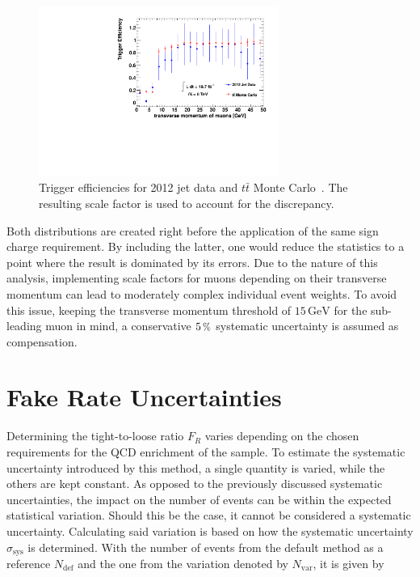 \begin{figure}[!htb]
  \centering
  \includegraphics[width=0.7\textwidth]{plots/trigger_eff.pdf}
  \caption{Trigger efficiencies for 2012 jet data and $t\bar{t}$ Monte Carlo~\cite{teyssier}. The resulting scale factor is used to account for the discrepancy.}
  \label{fig:triggereff}
\end{figure}

Both distributions are created right before the application of the same sign charge requirement. By including the latter, one would reduce the statistics to a point where the result is dominated by its errors. Due to the nature of this analysis, implementing scale factors for muons depending on their transverse momentum can lead to moderately complex individual event weights. To avoid this issue, keeping the transverse momentum threshold of $15\,\text{GeV}$ for the sub-leading muon in mind, a conservative $5\,\pct$ systematic uncertainty is assumed as compensation.

\section{Fake Rate Uncertainties}
\label{sec:tlsys}

Determining the tight-to-loose ratio $F_R$ varies depending on the chosen requirements for the QCD enrichment of the sample. To estimate the systematic uncertainty introduced by this method, a single quantity is varied, while the others are kept constant. As opposed to the previously discussed systematic uncertainties, the impact on the number of events can be within the expected statistical variation. Should this be the case, it cannot be considered a systematic uncertainty. Calculating said variation is based on how the systematic uncertainty $\sigma_{\text{sys}}$ is determined. With the number of events from the default method as a reference $N_{\text{def}}$ and the one from the variation denoted by $N_{\text{var}}$, it is given by

